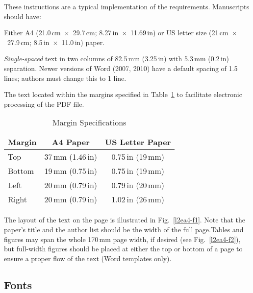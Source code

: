 \documentclass{JAC2003}
\begin{document}
These instructions are a typical implementation of the
requirements. Manuscripts should have:
\begin{Itemize}
    \item  Either A4 (21.0\,cm~$\times$~29.7\,cm; 8.27\,in~$\times$~11.69\,in) or US
           letter size (21\,cm~$\times$~27.9\,cm; 8.5\,in~$\times$~11.0\,in) paper.
    \item  {\it Single-spaced} text in two columns of 82.5\,mm (3.25\,in) with 5.3\,mm
           (0.2\,in) separation. Newer versions of Word (2007, 2010) have a default spacing
           of 1.5 lines; authors must change this to 1 line.
    \item  The text located within the margins specified in Table~\ref{l2ea4-t1}
           to facilitate electronic processing of the PDF file.
\end{Itemize}
\begin{table}[hbt]
   \centering
   \caption{Margin Specifications}
   \begin{tabular}{lcc}
       \toprule
       \textbf{Margin} & \textbf{A4 Paper} & \textbf{US Letter Paper} \\ 
       \midrule
           Top         & 37\,mm (1.46\,in)            & 0.75\,in (19\,mm)        \\
          Bottom     & 19\,mm (0.75\,in)            & 0.75\,in (19\,mm)        \\
           Left         & 20\,mm (0.79\,in)            & 0.79\,in (20\,mm)        \\
           Right       & 20\,mm (0.79\,in)            & 1.02\,in (26\,mm)        \\
       \bottomrule
   \end{tabular}
   \label{l2ea4-t1}
\end{table}

The layout of the text on the page is illustrated in
Fig.~\ref{l2ea4-f1}. Note that the paper's title and the author list should be the width of the
full page.Tables and figures may span the whole 170\,mm page width,
if desired (see Fig.~\ref{l2ea4-f2}), but full-width figures should be placed at
either the top or bottom of a page to ensure a proper flow of the text (Word templates only).


\subsection{Fonts}
\end{document}
